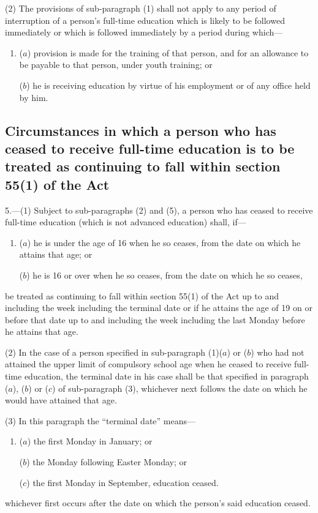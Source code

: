 \documentclass[a4paper]{article}
\begin{document}
(2) The provisions of sub-paragraph (1) shall not apply to any period of interruption of a person’s full-time education which is likely to be followed immediately or which is followed immediately by a period during which—
\begin{enumerate}\item[]
($a$) provision is made for the training of that person, and for an allowance to be payable to that person, under youth training; or

($b$) he is receiving education by virtue of his employment or of any office held by him.
\end{enumerate}

\subsection*{Circumstances in which a person who has ceased to receive full-time education is to be treated as continuing to fall within section 55(1) of the Act}

5.—(1) Subject to sub-paragraphs (2) and (5), a person who has ceased to receive full-time education (which is not advanced education) shall, if—
\begin{enumerate}\item[]
($a$) he is under the age of 16 when he so ceases, from the date on which he attains that age; or

($b$) he is 16 or over when he so ceases, from the date on which he so ceases,
\end{enumerate}
be treated as continuing to fall within section 55(1) of the Act up to and including the week including the terminal date or if he attains the age of 19 on or before that date up to and including the week including the last Monday before he attains that age.

(2) In the case of a person specified in sub-paragraph (1)($a$) or ($b$) who had not attained the upper limit of compulsory school age when he ceased to receive full-time education, the terminal date in his case shall be that specified in paragraph ($a$), ($b$) or ($c$) of sub-paragraph (3), whichever next follows the date on which he would have attained that age.

(3) In this paragraph the “terminal date” means—
\begin{enumerate}\item[]
($a$) the first Monday in January; or

($b$) the Monday following Easter Monday; or

($c$) the first Monday in September, education ceased.
\end{enumerate}
whichever first occurs after the date on which the person’s said education ceased.
\end{document}
